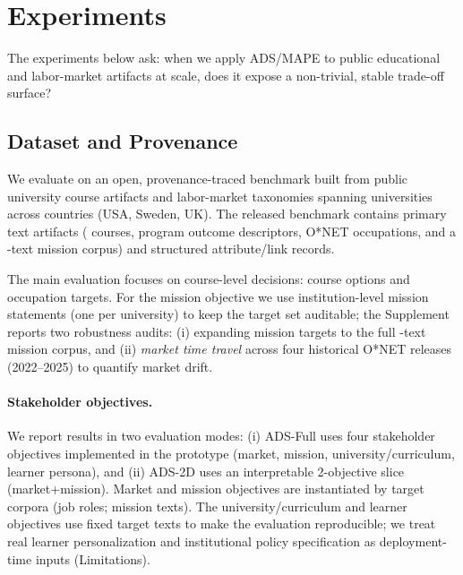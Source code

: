 \documentclass[sigconf,review]{acmart}
\newcommand{\ADS}{\textsc{ADS}\xspace}
\newcommand{\MAPE}{\textsc{MAPE}\xspace}
\begin{document}
\section{Experiments}
\label{sec:experiments}

The experiments below ask: when we apply \ADS/\MAPE to public educational and labor-market artifacts at scale, does it expose a non-trivial, stable trade-off surface?

\subsection{Dataset and Provenance}
\label{subsec:data}

We evaluate on an open, provenance-traced benchmark built from public university course artifacts and labor-market taxonomies spanning {\NumUniversities} universities across {\NumCountries} countries (USA, Sweden, UK). The released benchmark contains {\NumPrimaryArtifacts} primary text artifacts ({\NumCourses} courses, {\NumPrograms} program outcome descriptors, {\NumOccupations} O*NET occupations, and a {\NumMissionsExpanded}-text mission corpus) and {\NumAttributeRecords} structured attribute/link records.



The {main evaluation} focuses on course-level decisions: \NumCourses course options and \NumOccupations occupation targets. For the mission objective we use {\NumMissionsMain} institution-level mission statements (one per university) to keep the target set auditable; the Supplement reports two robustness audits: (i) expanding mission targets to the full \NumMissionsExpanded-text mission corpus, and (ii) \emph{market time travel} across four historical O*NET releases (2022--2025) to quantify market drift.

\paragraph{Stakeholder objectives.}
We report results in two evaluation modes:
(i) {ADS-Full} uses four stakeholder objectives implemented in the prototype (market, mission, university/curriculum, learner persona), and
(ii) {ADS-2D} uses an interpretable 2-objective slice (market+mission).
Market and mission objectives are instantiated by target corpora (job roles; mission texts). The university/curriculum and learner objectives use fixed target texts to make the evaluation reproducible; we treat real learner personalization and institutional policy specification as deployment-time inputs (Limitations).
\end{document}
